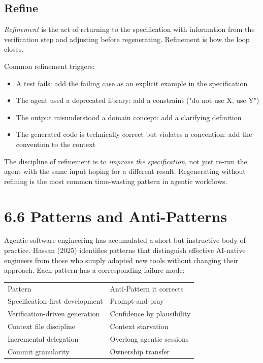 \documentclass[11pt,a4paper]{book}
\begin{document}
\subsection{Refine}

\textit{Refinement} is the act of returning to the specification with information from the verification step and adjusting before regenerating. Refinement is how the loop closes.

Common refinement triggers:

\begin{itemize}
  \item A test fails: add the failing case as an explicit example in the specification
  \item The agent used a deprecated library: add a constraint ("do not use X, use Y")
  \item The output misunderstood a domain concept: add a clarifying definition
  \item The generated code is technically correct but violates a convention: add the convention to the context
\end{itemize}

The discipline of refinement is to \textit{improve the specification}, not just re-run the agent with the same input hoping for a different result. Regenerating without refining is the most common time-wasting pattern in agentic workflows.

\medskip

\section{6.6 Patterns and Anti-Patterns}

Agentic software engineering has accumulated a short but instructive body of practice. Hassan (2025) identifies patterns that distinguish effective AI-native engineers from those who simply adopted new tools without changing their approach. Each pattern has a corresponding failure mode:

\begin{tabular}{ll}
\hline
Pattern & Anti-Pattern it corrects \\
Specification-first development & Prompt-and-pray \\
Verification-driven generation & Confidence by plausibility \\
Context file discipline & Context starvation \\
Incremental delegation & Overlong agentic sessions \\
Commit granularity & Ownership transfer \\
\hline
\end{tabular}
\end{document}
